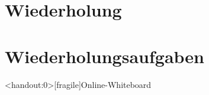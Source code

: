 \section{Wiederholung}





\section{Wiederholungsaufgaben}





\appendix

\begin{frame}<handout:0>[fragile]{Online-Whiteboard}
	\phantom{text}
\end{frame}


